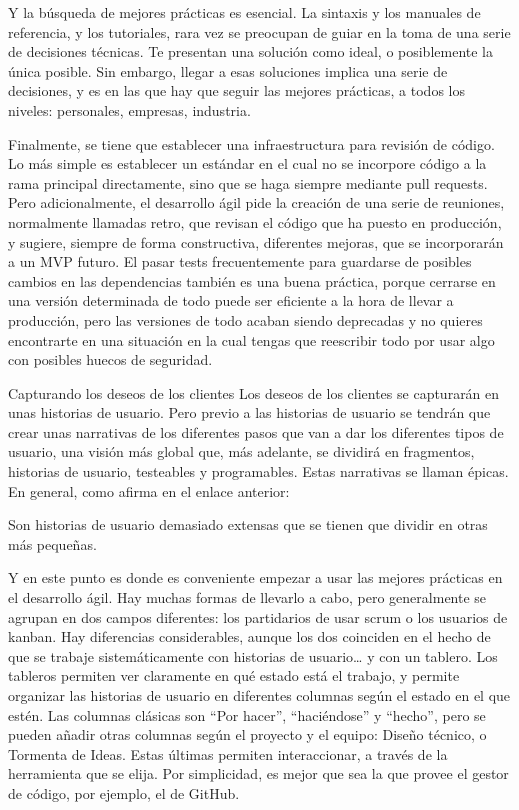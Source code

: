 \begin{itemize}
Y la búsqueda de mejores prácticas es esencial. La 
sintaxis y los manuales de referencia, y los tutoriales, 
rara vez se preocupan de guiar en la toma de una serie 
de decisiones técnicas. Te presentan una solución como 
ideal, o posiblemente la única posible. Sin embargo, 
llegar a esas soluciones implica una serie de decisiones, 
y es en las que hay que seguir las mejores prácticas, 
a todos los niveles: personales, empresas, industria.

Finalmente, se tiene que establecer una infraestructura 
para revisión de código. Lo más simple es establecer 
un estándar en el cual no se incorpore código a la 
rama principal directamente, sino que se haga 
siempre mediante pull requests. Pero adicionalmente, 
el desarrollo ágil pide la creación de una serie de 
reuniones, normalmente llamadas retro, que revisan 
el código que ha puesto en producción, y sugiere, 
siempre de forma constructiva, diferentes mejoras, que 
se incorporarán a un MVP futuro. El pasar tests 
frecuentemente para guardarse de posibles cambios 
en las dependencias también es una buena práctica, 
porque cerrarse en una versión determinada de todo 
puede ser eficiente a la hora de llevar a producción, 
pero las versiones de todo acaban siendo deprecadas y
no quieres encontrarte en una situación en la cual 
tengas que reescribir todo por usar algo con posibles huecos de seguridad.

\end{itemize}

Capturando los deseos de los clientes
Los deseos de los clientes se capturarán en unas historias de usuario. 
Pero previo a las historias de usuario se tendrán que crear unas 
narrativas de los diferentes pasos que van a dar los diferentes 
tipos de usuario, una visión más global que, más adelante, se 
dividirá en fragmentos, historias de usuario, testeables y 
programables. Estas narrativas se llaman épicas. En general, 
como afirma en el enlace anterior:

Son historias de usuario demasiado extensas que se tienen 
que dividir en otras más pequeñas.

Y en este punto es donde es conveniente empezar a usar las 
mejores prácticas en el desarrollo ágil. Hay muchas formas 
de llevarlo a cabo, pero generalmente se agrupan en dos 
campos diferentes: los partidarios de usar scrum o los 
usuarios de kanban. Hay diferencias considerables, aunque 
los dos coinciden en el hecho de que se trabaje sistemáticamente 
con historias de usuario… y con un tablero. Los tableros permiten 
ver claramente en qué estado está el trabajo, y permite organizar 
las historias de usuario en diferentes columnas según el estado 
en el que estén. Las columnas clásicas son “Por hacer”, 
“haciéndose” y “hecho”, pero se pueden añadir otras columnas 
según el proyecto y el equipo: Diseño técnico, o Tormenta 
de Ideas. Estas últimas permiten interaccionar, a través 
de la herramienta que se elija. Por simplicidad, es 
mejor que sea la que provee el gestor de código, por ejemplo, el de GitHub.

